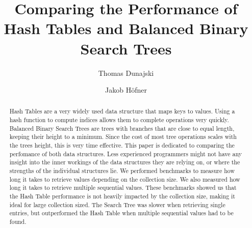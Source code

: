 \documentclass{llncs}
\begin{document}
%
\frontmatter %
%
\pagestyle{headings}  %
%
\mainmatter %
%
\title{Comparing the Performance of Hash Tables and Balanced Binary Search Trees}
%
%
\author{Thomas Dunajski \and Jakob Höfner}

%


\maketitle %

\begin{abstract}
Hash Tables are a very widely used data structure that maps keys to values. Using a hash function to compute indices allows them to complete operations very quickly. Balanced Binary Search Trees are trees with branches that are close to equal length, keeping their height to a minimum. Since the cost of most tree operations scales with the trees height, this is very time effective. This paper is dedicated to comparing the perfomance of both data structures. Less experienced programmers might not have any insight into the inner workings of the data structures they are relying on, or where the strengths of the individual structures lie. We performed benchmarks to measure how long it takes to retrieve values depending on the collection size. We also measured how long it takes to retrieve multiple sequential values. These benchmarks showed us that the Hash Table performance is not heavily impacted by the collection size, making it ideal for large collection sized.  The Search Tree was slower when retrieving single entries, but outperformed the Hash Table when multiple sequential values had to be found.
\end{abstract}

\tableofcontents
\newpage




\end{document}
